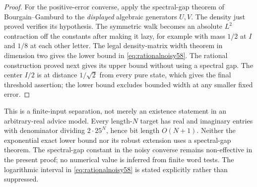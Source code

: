 \begin{proof}
For the positive-error converse, apply the spectral-gap theorem of
Bourgain--Gamburd \cite[Theorem~1]{BG2012} to the \emph{displayed} algebraic
generators $U,V$. The density just proved verifies its hypothesis.
The symmetric walk becomes an absolute $L^2$ contraction off the
constants after making it lazy, for example with mass $1/2$ at $I$ and
$1/8$ at each other letter. The legal density-matrix width theorem in
dimension two gives the lower bound in \eqref{eq:rationalnoisy58}.
The rational construction proved next gives its upper bound without
using a spectral gap. The center $I/2$ is at distance $1/\sqrt2$ from
every pure state, which gives the final threshold assertion; the lower
bound excludes bounded width at any smaller fixed error.
\end{proof}
This is a finite-input separation, not merely an existence statement in
an arbitrary-real advice model. Every length-$N$ target has real and
imaginary entries with denominator dividing $2\cdot25^N$, hence bit
length $O(N+1)$. Neither the exponential exact lower bound nor its robust
extension uses a spectral-gap theorem. The spectral-gap constant in the
noisy converse remains non-effective in the present proof; no numerical
value is inferred from finite word tests. The logarithmic interval in
\eqref{eq:rationalnoisy58} is stated explicitly rather than suppressed.
